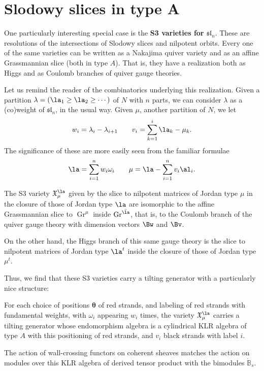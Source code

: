 \section{Slodowy slices in type A}

One particularly interesting special case is the {\bf S3 varieties for $\mathfrak{sl}_n$}.  These are resolutions of the intersections of Slodowy slices and nilpotent orbits.  Every one of the same varieties can be written as a Nakajima quiver variety and as an affine Grassmannian slice (both in type $A$).  That is, they have a realization both as Higgs and as Coulomb branches of quiver gauge theories.  

Let us remind the reader of the combinatorics underlying this realization.  Given a partition $\lambda=(\la_1\geq \la_2\geq \cdots)$ of $N$ with $n$ parts, we can consider $\lambda$ as a (co)weight of $\mathfrak{sl}_n$, in the usual way.  Given $\mu$, another partition of $N$, 
we let \[w_i=\lambda_i-\lambda_{i+1}\qquad v_i=\sum_{k=1}^i \la_k-\mu_k.\]
The significance of these are more easily seen from the familiar formulae \[\la=\sum_{i=1}^nw_i\omega_i\qquad \mu=\la-\sum_{i=1}^nv_i\al_i.\]
\begin{theorem}
  The S3 variety $\mathfrak{X}^\la_\mu$ given by the slice to nilpotent matrices of Jordan type $\mu$ in the closure of those of Jordan type $\la$ are isomorphic to the affine Grassmannian slice to $\operatorname{Gr}^{\mu}$ inside $\operatorname{Gr}^{\bar \la}$, that is, to the Coulomb branch of the quiver gauge theory with dimension vectors $\Bw$ and $\Bv$.   
\end{theorem}
On the other hand, the Higgs branch of this same gauge theory is the slice to nilpotent matrices of Jordan type $\la^t$  inside the closure of those of Jordan type  $\mu^t$. 

Thus, we find that these S3 varieties carry a tilting generator with a particularly nice structure:
\begin{theorem}
  For each choice of positions $\boldsymbol{\theta}$ of red strands, and labeling of red strands with fundamental weights, with $\omega_i$ appearing $w_i$ times,
  the variety $\mathfrak{X}^\la_\mu$ carries a tilting generator whose endomorphism algebra is a cylindrical KLR algebra of type $A$ with this positioning of red strands, and $v_i$ black strands with label $i$. 
  
  The action of wall-crossing functors on coherent sheaves matches the action on modules over this KLR algebra of derived tensor product with the bimodules $\mathbb{\mathring{B}}_{s}$.
\end{theorem}

